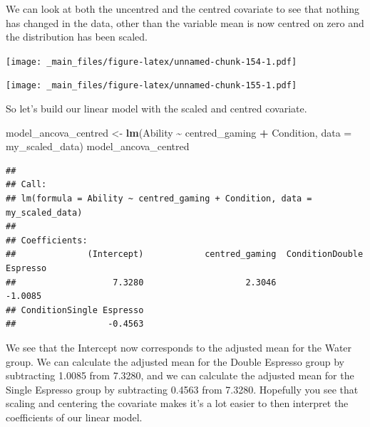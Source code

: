 \documentclass[
]{book}
\newenvironment{Shaded}{\begin{snugshade}}{\end{snugshade}}
\newcommand{\AttributeTok}[1]{\textcolor[rgb]{0.13,0.29,0.53}{#1}}
\newcommand{\FunctionTok}[1]{\textcolor[rgb]{0.13,0.29,0.53}{\textbf{#1}}}
\newcommand{\NormalTok}[1]{#1}
\newcommand{\OtherTok}[1]{\textcolor[rgb]{0.56,0.35,0.01}{#1}}
\newcommand{\SpecialCharTok}[1]{\textcolor[rgb]{0.81,0.36,0.00}{\textbf{#1}}}
\begin{document}
We can look at both the uncentred and the centred covariate to see that nothing has changed in the data, other than the variable mean is now centred on zero and the distribution has been scaled.

\begin{Shaded}
\end{Shaded}

\texttt{[image: \_main\_files/figure-latex/unnamed-chunk-154-1.pdf]}

\begin{Shaded}
\end{Shaded}

\texttt{[image: \_main\_files/figure-latex/unnamed-chunk-155-1.pdf]}

So let's build our linear model with the scaled and centred covariate.

\begin{Shaded}
\begin{Highlighting}[]
\NormalTok{model\_ancova\_centred }\OtherTok{\textless{}{-}} \FunctionTok{lm}\NormalTok{(Ability }\SpecialCharTok{\textasciitilde{}}\NormalTok{ centred\_gaming }\SpecialCharTok{+}\NormalTok{ Condition, }\AttributeTok{data =}\NormalTok{ my\_scaled\_data)}
\NormalTok{model\_ancova\_centred}
\end{Highlighting}
\end{Shaded}

\begin{verbatim}
## 
## Call:
## lm(formula = Ability ~ centred_gaming + Condition, data = my_scaled_data)
## 
## Coefficients:
##              (Intercept)            centred_gaming  ConditionDouble Espresso  
##                   7.3280                    2.3046                   -1.0085  
## ConditionSingle Espresso  
##                  -0.4563
\end{verbatim}

We see that the Intercept now corresponds to the adjusted mean for the Water group. We can calculate the adjusted mean for the Double Espresso group by subtracting 1.0085 from 7.3280, and we can calculate the adjusted mean for the Single Espresso group by subtracting 0.4563 from 7.3280. Hopefully you see that scaling and centering the covariate makes it's a lot easier to then interpret the coefficients of our linear model.
\end{document}

